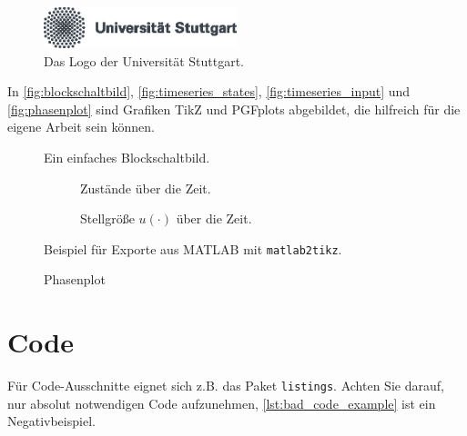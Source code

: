 \begin{figure}[htb]
\centering
\includegraphics[width=0.5\textwidth]{images/logo-university-de.eps}
\caption{Das Logo der Universität Stuttgart.}
\label{fig:ustutt_logo}
\end{figure}

In \autoref{fig:blockschaltbild}, \autoref{fig:timeseries_states}, \autoref{fig:timeseries_input} und \autoref{fig:phasenplot} sind Grafiken TikZ und PGFplots abgebildet, die hilfreich für die eigene Arbeit sein können.


\begin{figure}[htbp]
    \centering
    
    \caption{Ein einfaches Blockschaltbild.}
    \label{fig:blockschaltbild}
\end{figure}

\begin{figure}[htbp]

\centering
\begin{subfigure}[b]{0.95\textwidth}
    
    \caption{Zustände über die Zeit.}
    \label{fig:timeseries_states}
\end{subfigure}

\begin{subfigure}[b]{0.95\textwidth}
    
    \caption{Stellgröße \(u(\cdot)\) über die Zeit.}
    \label{fig:timeseries_input}
\end{subfigure}

\caption{Beispiel für Exporte  aus MATLAB mit \texttt{matlab2tikz}.}
\label{fig:timeseries}
\end{figure}


\begin{figure}[htbp]
    \centering
    
    \caption{Phasenplot}
    \label{fig:phasenplot}
\end{figure}

\FloatBarrier

\section{Code}

Für Code-Ausschnitte eignet sich z.B. das Paket \texttt{listings}. 
Achten Sie darauf, nur absolut notwendigen Code aufzunehmen, \autoref{lst:bad_code_example} ist ein Negativbeispiel.

